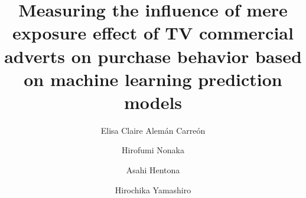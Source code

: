 \documentclass[review]{elsarticle}
\begin{document}
\begin{frontmatter}

\title{Measuring the influence of mere exposure effect of TV commercial adverts on purchase behavior based on machine learning prediction models}

\author[gidai]{Elisa Claire Alemán Carreón
}

\author[gidai]{Hirofumi Nonaka}

\author[gidai]{Asahi Hentona}

\author[gidai]{Hirochika Yamashiro}

\address[gidai]{Nagaoka University of Technology, Nagaoka, Japan}





\end{frontmatter}
\end{document}
